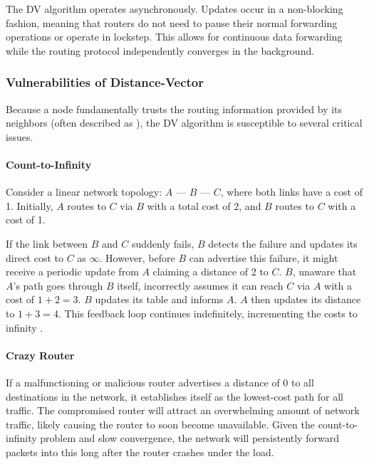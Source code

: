 The DV algorithm operates asynchronously. Updates occur in a non-blocking fashion, meaning that routers do not need to pause their normal forwarding operations or operate in lockstep. This allows for continuous data forwarding while the routing protocol independently converges in the background.

\subsubsection{Vulnerabilities of Distance-Vector}
Because a node fundamentally trusts the routing information provided by its neighbors (often described as ), the DV algorithm is susceptible to several critical issues.

\paragraph{Count-to-Infinity}
Consider a linear network topology: \( A \) --- \( B \) --- \( C \), where both links have a cost of 1. Initially, \( A \) routes to \( C \) via \( B \) with a total cost of 2, and \( B \) routes to \( C \) with a cost of 1. 

If the link between \( B \) and \( C \) suddenly fails, \( B \) detects the failure and updates its direct cost to \( C \) as \( \infty \). However, before \( B \) can advertise this failure, it might receive a periodic update from \( A \) claiming a distance of 2 to \( C \). \( B \), unaware that \( A \)'s path goes through \( B \) itself, incorrectly assumes it can reach \( C \) via \( A \) with a cost of \( 1 + 2 = 3 \). \( B \) updates its table and informs \( A \). \( A \) then updates its distance to \( 1 + 3 = 4 \). This feedback loop continues indefinitely, incrementing the costs to infinity \cite{tanenbaum2011}.

\paragraph{Crazy Router}
If a malfunctioning or malicious router advertises a distance of 0 to all destinations in the network, it establishes itself as the lowest-cost path for all traffic. The compromised router will attract an overwhelming amount of network traffic, likely causing the router to soon become unavailable. 
Given the count-to-infinity problem and slow convergence, the network will persistently forward packets into this  long after the router crashes under the load.

